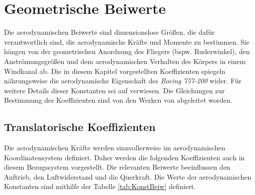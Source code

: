 \section{Geometrische Beiwerte}
\label{sec:Beiwerte}
Die aerodynamischen Beiwerte sind dimensionslose Grö{\ss}en, die dafür verantwortlich sind, die aerodynamische Kräfte und Momente zu bestimmen. Sie hängen von der geometrischen Anordnung des Fliegers (bspw. Ruderwinkel), den Anströmungsgrö{\ss}en und dem aerodynamischen Verhalten des Körpers in einem Windkanal ab. Die in diesem Kapitel vorgestellten Koeffizienten spiegeln nährungsweise die aerodynamische Eigenschaft des \textit{Boeing 757-200} wider. Für weitere Details dieser Konstanten sei auf \cite{AircraftCS,RAMPaper,RAMYoutube_Playlist} verwiesen. Die Gleichungen zur Bestimmung der Koeffizienten sind von den Werken von \cite{FlugmechanikBuch,FM1Skrypt} abgeleitet worden. 

\subsection{Translatorische Koeffizienten}
Die aerodynamischen Kräfte werden sinnvollerweise im aerodynamischen Koordinatensystem definiert. Daher werden die folgenden Koeffizienten auch in diesem Bezugssystem vorgestellt. Die relevanten Beiwerte beeinflussen den Auftrieb, den Luftwiderstand und die Querkraft. Die Werte der aerodynamischen Konstanten sind mithilfe der Tabelle \ref{tab:KonstBeiw} definiert. 


